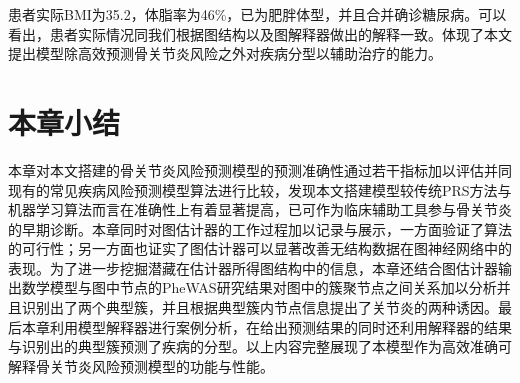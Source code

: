 患者实际BMI为35.2，体脂率为46\%，已为肥胖体型，并且合并确诊糖尿病。可以看出，患者实际情况同我们根据图结构以及图解释器做出的解释一致。体现了本文提出模型除高效预测骨关节炎风险之外对疾病分型以辅助治疗的能力。

\section{本章小结}

本章对本文搭建的骨关节炎风险预测模型的预测准确性通过若干指标加以评估并同现有的常见疾病风险预测模型算法进行比较，发现本文搭建模型较传统PRS方法与机器学习算法而言在准确性上有着显著提高，已可作为临床辅助工具参与骨关节炎的早期诊断。本章同时对图估计器的工作过程加以记录与展示，一方面验证了算法的可行性；另一方面也证实了图估计器可以显著改善无结构数据在图神经网络中的表现。为了进一步挖掘潜藏在估计器所得图结构中的信息，本章还结合图估计器输出数学模型与图中节点的PheWAS研究结果对图中的簇聚节点之间关系加以分析并且识别出了两个典型簇，并且根据典型簇内节点信息提出了关节炎的两种诱因。最后本章利用模型解释器进行案例分析，在给出预测结果的同时还利用解释器的结果与识别出的典型簇预测了疾病的分型。以上内容完整展现了本模型作为高效准确可解释骨关节炎风险预测模型的功能与性能。